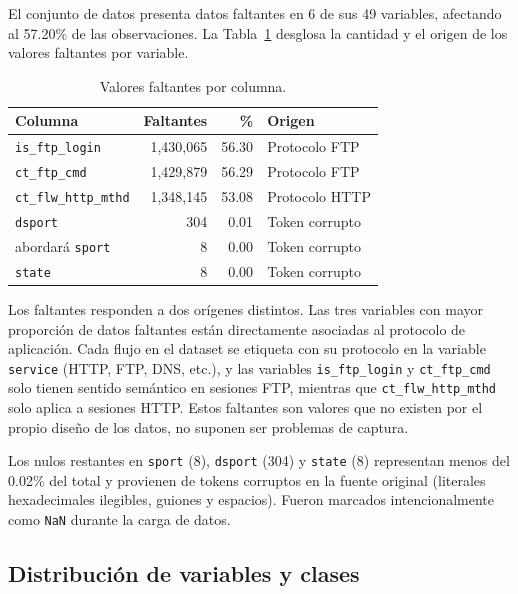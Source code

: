 \documentclass[conference]{IEEEtran}
\begin{document}
\FloatBarrier

El conjunto de datos presenta datos faltantes en 6 de sus 49 variables, afectando al 57.20\% de las observaciones. La Tabla~\ref{tab:faltantes} desglosa la cantidad y el origen de los valores faltantes por variable.

\begin{table}[h!]
\centering
\caption{Valores faltantes por columna.}
\label{tab:faltantes}
\begin{tabular}{lrrl}
\hline
\textbf{Columna} & \textbf{Faltantes} & \textbf{\%} & \textbf{Origen} \\
\hline
\texttt{is\_ftp\_login} & 1,430,065 & 56.30 & Protocolo FTP \\
\texttt{ct\_ftp\_cmd}    & 1,429,879 & 56.29 & Protocolo FTP \\
\texttt{ct\_flw\_http\_mthd} & 1,348,145 & 53.08 & Protocolo HTTP \\
\texttt{dsport}          & 304       & 0.01  & Token corrupto \\abordará
\texttt{sport}           & 8         & 0.00  & Token corrupto \\
\texttt{state}           & 8         & 0.00  & Token corrupto \\
\hline
\end{tabular}
\end{table}

Los faltantes responden a dos orígenes distintos. Las tres variables con mayor proporción de datos faltantes están directamente asociadas al protocolo de aplicación. Cada flujo en el dataset se etiqueta con su protocolo en la variable \texttt{service} (HTTP, FTP, DNS, etc.), y las variables \texttt{is\_ftp\_login} y \texttt{ct\_ftp\_cmd} solo tienen sentido semántico en sesiones FTP, mientras que \texttt{ct\_flw\_http\_mthd} solo aplica a sesiones HTTP. Estos faltantes son valores que no existen por el propio diseño de los datos, no suponen ser problemas de captura.

Los nulos restantes en \texttt{sport} (8), \texttt{dsport} (304) y \texttt{state} (8) representan menos del 0.02\% del total y provienen de tokens corruptos en la fuente original (literales hexadecimales ilegibles, guiones y espacios). Fueron marcados intencionalmente como \texttt{NaN} durante la carga de datos.

\FloatBarrier

\subsection{Distribución de variables y clases}
\end{document}

